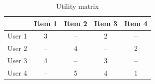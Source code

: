 \begin{table}[h]
    \centering
    \caption{Utility matrix}
    \label{tab:utility-matrix}
    \begin{tabular}{|l|c|c|c|c|}
        \hline
        & \textbf{Item 1} & \textbf{Item 2} & \textbf{Item 3} & \textbf{Item 4} \\
        \hline
        User 1 & 3 & -- & 2 & -- \\
        \hline
        User 2 & -- & 4 & -- & 2 \\
        \hline
        User 3 & 4 & -- & 3 & -- \\
        \hline
        User 4 & -- & 5 & 4 & 1 \\
        \hline
    \end{tabular}
\end{table}